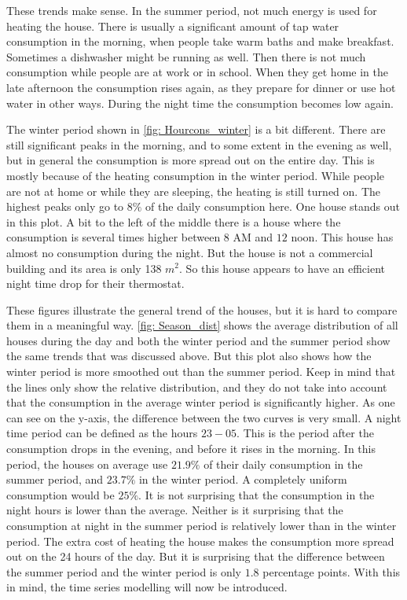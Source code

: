 \noindent These trends make sense. In the summer period, not much energy is used for heating the house. There is usually a significant amount of tap water consumption in the morning, when people take warm baths and make breakfast. Sometimes a dishwasher might be running as well. Then there is not much consumption while people are at work or in school. When they get home in the late afternoon the consumption rises again, as they prepare for dinner or use hot water in other ways. During the night time the consumption becomes low again.



\noindent The winter period shown in \cref{fig: Hourcons_winter} is a bit different. There are still significant peaks in the morning, and to some extent in the evening as well, but in general the consumption is more spread out on the entire day. This is mostly because of the heating consumption in the winter period. While people are not at home or while they are sleeping, the heating is still turned on. The highest peaks only go to $8\%$ of the daily consumption here. One house stands out in this plot. A bit to the left of the middle there is a house where the consumption is several times higher between $8$ AM and $12$ noon. This house has almost no consumption during the night. But the house is not a commercial building and its area is only 138 $m^2$. So this house appears to have an efficient night time drop for their thermostat.


\noindent These figures illustrate the general trend of the houses, but it is hard to compare them in a meaningful way. \cref{fig: Season_dist} shows the average distribution of all houses during the day and both the winter period and the summer period show the same trends that was discussed above. But this plot also shows how the winter period is more smoothed out than the summer period. Keep in mind that the lines only show the relative distribution, and they do not take into account that the consumption in the average winter period is significantly higher. As one can see on the y-axis, the difference between the two curves is very small. A night time period can be defined as the hours $23-05$. This is the period after the consumption drops in the evening, and before it rises in the morning. In this period, the houses on average use $21.9\%$ of their daily consumption in the summer period, and $23.7\%$ in the winter period. A completely uniform consumption would be $25\%$. It is not surprising that the consumption in the night hours is lower than the average. Neither is it surprising that the consumption at night in the summer period is relatively lower than in the winter period. The extra cost of heating the house makes the consumption more spread out on the 24 hours of the day. But it is surprising that the difference between the summer period and the winter period is only $1.8$ percentage points. With this in mind, the time series modelling will now be introduced.


